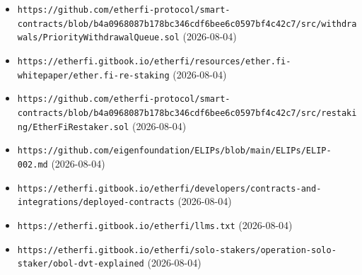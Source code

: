 \begin{itemize}
\item \texttt{https://github.com/etherfi-protocol/smart-contracts/blob/b4a0968087b178bc346cdf6bee6c0597bf4c42c7/src/withdrawals/PriorityWithdrawalQueue.sol} (2026-08-04)
\item \texttt{https://etherfi.gitbook.io/etherfi/resources/ether.fi-whitepaper/ether.fi-re-staking} (2026-08-04)
\item \texttt{https://github.com/etherfi-protocol/smart-contracts/blob/b4a0968087b178bc346cdf6bee6c0597bf4c42c7/src/restaking/EtherFiRestaker.sol} (2026-08-04)
\item \texttt{https://github.com/eigenfoundation/ELIPs/blob/main/ELIPs/ELIP-002.md} (2026-08-04)
\item \texttt{https://etherfi.gitbook.io/etherfi/developers/contracts-and-integrations/deployed-contracts} (2026-08-04)
\item \texttt{https://etherfi.gitbook.io/etherfi/llms.txt} (2026-08-04)
\item \texttt{https://etherfi.gitbook.io/etherfi/solo-stakers/operation-solo-staker/obol-dvt-explained} (2026-08-04)
\end{itemize}

